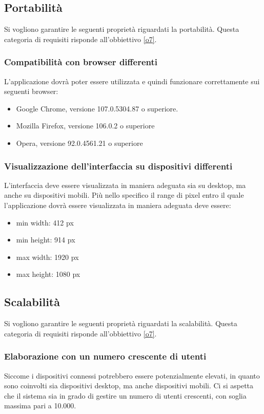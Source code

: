 \subsection{Portabilità}
Si vogliono garantire le seguenti proprietà riguardati la portabilità. Questa categoria di requisiti risponde all'obbiettivo \ref{o7}.

\subsubsection{Compatibilità con browser differenti}
L'applicazione dovrà poter essere utilizzata e quindi funzionare correttamente sui seguenti browser:
\begin{itemize}
    \item Google Chrome, versione 107.0.5304.87 o superiore.
    \item Mozilla Firefox, versione 106.0.2 o superiore
    \item Opera, versione 92.0.4561.21 o superiore
\end{itemize}

\subsubsection{Visualizzazione dell'interfaccia su dispositivi differenti}
L’interfaccia deve essere visualizzata in maniera adeguata sia su desktop, ma anche su dispositivi mobili. Più nello specifico il range di pixel entro il quale l'applicazione dovrà essere visualizzata in maniera adeguata deve essere:
\begin{itemize}
    \item min width: 412 px
    \item min height: 914 px
    \item max width: 1920 px
    \item max height: 1080 px
\end{itemize}

\subsection{Scalabilità}
Si vogliono garantire le seguenti proprietà riguardati la scalabilità. Questa categoria di requisiti risponde all'obbiettivo \ref{o7}.

\subsubsection{Elaborazione con un numero crescente di utenti}
Siccome i dispositivi connessi potrebbero essere potenzialmente elevati, in quanto sono coinvolti sia dispositivi desktop, ma anche dispositivi mobili. Ci si aspetta che il sistema sia in grado di gestire un numero di utenti crescenti, con soglia massima pari a 10.000.

